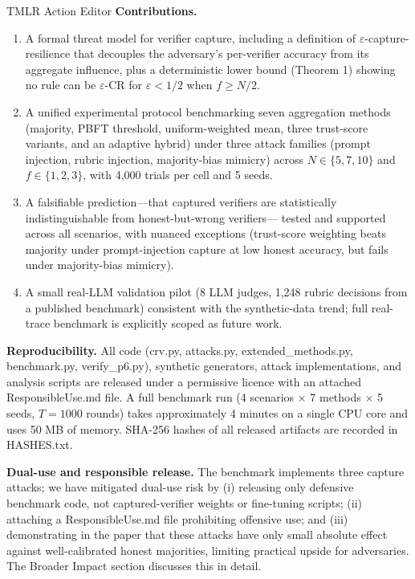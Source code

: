 \documentclass[11pt]{letter}
\begin{document}
\begin{letter}{TMLR Action Editor}
\noindent\textbf{Contributions.}
\begin{enumerate}
\item A formal threat model for verifier capture, including a
      definition of $\varepsilon$-capture-resilience that decouples
      the adversary's per-verifier accuracy from its aggregate
      influence, plus a deterministic lower bound (Theorem 1) showing
      no rule can be $\varepsilon$-CR for $\varepsilon < 1/2$ when
      $f \geq N/2$.
\item A unified experimental protocol benchmarking seven aggregation
      methods (majority, PBFT threshold, uniform-weighted mean, three
      trust-score variants, and an adaptive hybrid) under three attack
      families (prompt injection, rubric injection, majority-bias
      mimicry) across $N \in \{5,7,10\}$ and $f \in \{1,2,3\}$, with
      4,000 trials per cell and 5 seeds.
\item A falsifiable prediction---that captured verifiers are
      statistically indistinguishable from honest-but-wrong verifiers---
      tested and supported across all scenarios, with nuanced exceptions
      (trust-score weighting beats majority under prompt-injection
      capture at low honest accuracy, but fails under majority-bias
      mimicry).
\item A small real-LLM validation pilot (8 LLM judges, 1,248 rubric
      decisions from a published benchmark) consistent with the
      synthetic-data trend; full real-trace benchmark is explicitly
      scoped as future work.
\end{enumerate}

\bigskip

\noindent\textbf{Reproducibility.} All code (crv.py, attacks.py,
extended\_methods.py, benchmark.py, verify\_p6.py), synthetic
generators, attack implementations, and analysis scripts are released
under a permissive licence with an attached ResponsibleUse.md file.
A full benchmark run (4 scenarios $\times$ 7 methods $\times$ 5 seeds,
$T=1000$ rounds) takes approximately 4 minutes on a single CPU core
and uses 50 MB of memory. SHA-256 hashes of all released artifacts
are recorded in HASHES.txt.

\bigskip

\noindent\textbf{Dual-use and responsible release.} The benchmark
implements three capture attacks; we have mitigated dual-use risk by
(i) releasing only defensive benchmark code, not captured-verifier
weights or fine-tuning scripts; (ii) attaching a ResponsibleUse.md
file prohibiting offensive use; and (iii) demonstrating in the paper
that these attacks have only small absolute effect against
well-calibrated honest majorities, limiting practical upside for
adversaries. The Broader Impact section discusses this in detail.


\end{letter}
\end{document}
